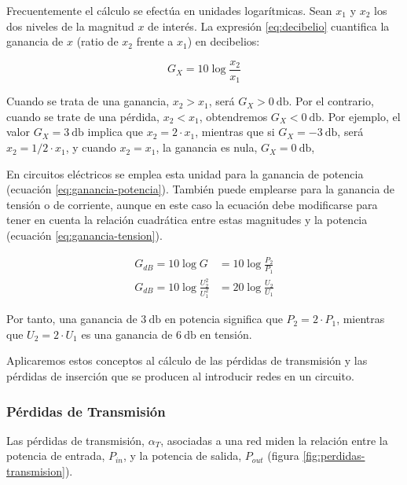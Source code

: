 Frecuentemente el cálculo se efectúa en unidades logarítmicas. Sean
$x_1$ y $x_2$ los dos niveles de la magnitud $x$ de interés. La
expresión \ref{eq:decibelio} cuantifica la ganancia de $x$ (ratio de
$x_2$ frente a $x_1$) en decibelios:

\begin{equation}
  \label{eq:decibelio}
  G_X = 10 \log \frac{x_2}{x_1}
\end{equation}

Cuando se trata de una ganancia, $x_2 > x_1$, será
$G_X > \qty{0}{\decibel}$. Por el contrario, cuando se trate de una
pérdida, $x_2 < x_1$, obtendremos $G_X < \qty{0}{\decibel}$. Por
ejemplo, el valor $G_X = \qty{3}{\decibel}$ implica que
$x_2 = 2 \cdot x_1$, mientras que si $G_X = - \qty{3}{\decibel}$, será
$x_2 = 1/2 \cdot x_1$, y cuando $x_2 = x_1$, la ganancia es nula,
$G_X = \qty{0}{\decibel}$,

En circuitos eléctricos se emplea esta unidad para la ganancia de
potencia (ecuación \ref{eq:ganancia-potencia}). También puede
emplearse para la ganancia de tensión o de corriente, aunque en este
caso la ecuación debe modificarse para tener en cuenta la relación
cuadrática entre estas magnitudes y la potencia (ecuación
\ref{eq:ganancia-tension}).

\begin{align}
  G_{dB} = 10 \log G &= 10 \log \frac{P_2}{P_1} \label{eq:ganancia-potencia}\\
  G_{dB} = 10 \log \frac{U_2^2}{U_1^2} &= 20 \log \frac{U_2}{U_1}   \label{eq:ganancia-tension}
\end{align}

Por tanto, una ganancia de $\qty{3}{\decibel}$ en potencia significa
que $P_2 = 2 \cdot P_1$, mientras que $U_2 = 2 \cdot U_1$ es una
ganancia de $\qty{6}{\decibel}$ en tensión.

Aplicaremos estos conceptos al cálculo de las pérdidas de transmisión y las pérdidas de inserción que se producen al introducir redes en un circuito.

\subsubsection{Pérdidas de Transmisión}
\label{sec:perdidas-transmision}

Las pérdidas de transmisión, $\alpha_T$, asociadas a una red miden la
relación entre la potencia de entrada, $P_{in}$, y la potencia de
salida, $P_{out}$ (figura \ref{fig:perdidas-transmision}).

